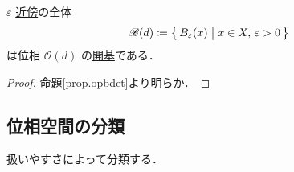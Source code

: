 \documentclass[geometry_main]{subfiles}
\begin{document}
\begin{mycol}{}
	$\varepsilon$ \hyperref[def:neighborhood]{近傍}の全体
	\begin{align}
		\mathscr{B}(d) \coloneqq \bigl\{\, B_\varepsilon(x) \bigm| x \in X,\, \varepsilon > 0 \,\bigr\}
	\end{align}
	は位相 $\mathscr{O}(d)$ の\hyperref[def.opbase]{開基}である．
\end{mycol}

\begin{proof}
	命題\ref{prop.opbdet}より明らか．
\end{proof}

\subsection{位相空間の分類}

扱いやすさによって分類する．
\end{document}
